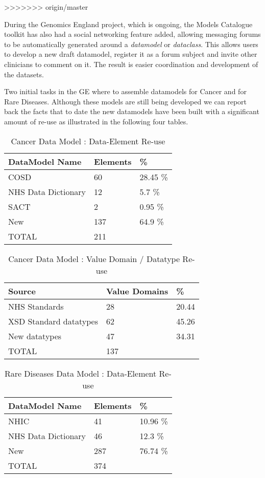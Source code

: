 >>>>>>> origin/master



During the Genomics England project, which is ongoing, the Models Catalogue toolkit has also had a social networking feature added, allowing messaging forums to be automatically generated around a \emph{datamodel} or \emph{dataclass}. This allows users to develop a new draft datamodel, register it as a forum subject and invite other clinicians to comment on it. The result is easier coordination and development of the datasets. 

Two initial tasks in the GE where to assemble datamodels for Cancer and for Rare Diseases. Although these models are still being developed we can report back the facts that to date the new datamodels have been built with a significant amount of re-use as illustrated in the following four tables.

\begin{table}[h]
	\caption{Cancer Data Model : Data-Element Re-use}
	\begin{tabular}{ p{2.8cm} p{1.8cm}  p{1.8cm}   }  %
		\hline
		DataModel Name &  Elements & \%  \\ 
		\hline
		COSD & 60 & 28.45 \% \\
		NHS Data Dictionary & 12 & 5.7 \% \\
		SACT & 2 & 0.95 \% \\
		New & 137 & 64.9 \% \\
		\hline
		TOTAL & 211
	\end{tabular}
\end{table}

\begin{table}[h]
		\caption{Cancer Data Model : Value Domain / Datatype Re-use}
	\begin{tabular}{p{2.8cm} p{1.8cm}  p{1.8cm}     }  %
		\hline
		Source & Value Domains& \%  \\ 
		\hline
		NHS Standards & 28 & 20.44\\
		XSD Standard datatypes & 62 & 45.26 \\
		New datatypes & 47 & 34.31 \\
		\hline
		TOTAL & 137
	\end{tabular}
\end{table}

\begin{table}[h]
	\caption{Rare Diseases Data Model : Data-Element Re-use}
	\begin{tabular}{ p{2.8cm} p{1.8cm}  p{1.8cm}   }  %
		\hline
		DataModel Name &  Elements & \%  \\ 
		\hline
		NHIC & 41 & 10.96 \% \\
		NHS Data Dictionary & 46 & 12.3 \% \\
		New & 287 & 76.74 \% \\
		\hline
		TOTAL & 374
	\end{tabular}
\end{table}


